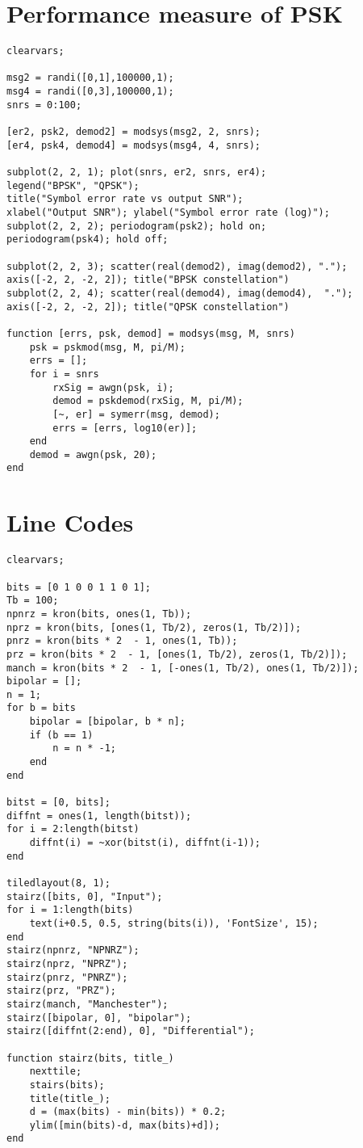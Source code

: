 \documentclass[12pt,a4paper]{article}
\newcommand{\sectiona}[1]{\pagebreak \section{\centering #1}}
\begin{document}
\sectiona{Performance measure of PSK}
\begin{verbatim}
clearvars;

msg2 = randi([0,1],100000,1);
msg4 = randi([0,3],100000,1);
snrs = 0:100;

[er2, psk2, demod2] = modsys(msg2, 2, snrs);
[er4, psk4, demod4] = modsys(msg4, 4, snrs);

subplot(2, 2, 1); plot(snrs, er2, snrs, er4);
legend("BPSK", "QPSK");
title("Symbol error rate vs output SNR");
xlabel("Output SNR"); ylabel("Symbol error rate (log)");
subplot(2, 2, 2); periodogram(psk2); hold on;
periodogram(psk4); hold off;

subplot(2, 2, 3); scatter(real(demod2), imag(demod2), ".");
axis([-2, 2, -2, 2]); title("BPSK constellation")
subplot(2, 2, 4); scatter(real(demod4), imag(demod4),  ".");
axis([-2, 2, -2, 2]); title("QPSK constellation")

function [errs, psk, demod] = modsys(msg, M, snrs)
    psk = pskmod(msg, M, pi/M);
    errs = [];
    for i = snrs
        rxSig = awgn(psk, i);
        demod = pskdemod(rxSig, M, pi/M);
        [~, er] = symerr(msg, demod);
        errs = [errs, log10(er)];
    end
    demod = awgn(psk, 20);
end
\end{verbatim}

\sectiona{Line Codes}
\begin{verbatim}
clearvars;

bits = [0 1 0 0 1 1 0 1];
Tb = 100;
npnrz = kron(bits, ones(1, Tb));
nprz = kron(bits, [ones(1, Tb/2), zeros(1, Tb/2)]);
pnrz = kron(bits * 2  - 1, ones(1, Tb));
prz = kron(bits * 2  - 1, [ones(1, Tb/2), zeros(1, Tb/2)]);
manch = kron(bits * 2  - 1, [-ones(1, Tb/2), ones(1, Tb/2)]);
bipolar = [];
n = 1;
for b = bits
    bipolar = [bipolar, b * n];
    if (b == 1)
        n = n * -1;
    end
end

bitst = [0, bits];
diffnt = ones(1, length(bitst));
for i = 2:length(bitst)
    diffnt(i) = ~xor(bitst(i), diffnt(i-1));
end

tiledlayout(8, 1);
stairz([bits, 0], "Input");
for i = 1:length(bits)
    text(i+0.5, 0.5, string(bits(i)), 'FontSize', 15);
end
stairz(npnrz, "NPNRZ");
stairz(nprz, "NPRZ");
stairz(pnrz, "PNRZ");
stairz(prz, "PRZ");
stairz(manch, "Manchester");
stairz([bipolar, 0], "bipolar");
stairz([diffnt(2:end), 0], "Differential");

function stairz(bits, title_)
    nexttile;
    stairs(bits);
    title(title_);
    d = (max(bits) - min(bits)) * 0.2;
    ylim([min(bits)-d, max(bits)+d]);
end

\end{verbatim}
\end{document}

